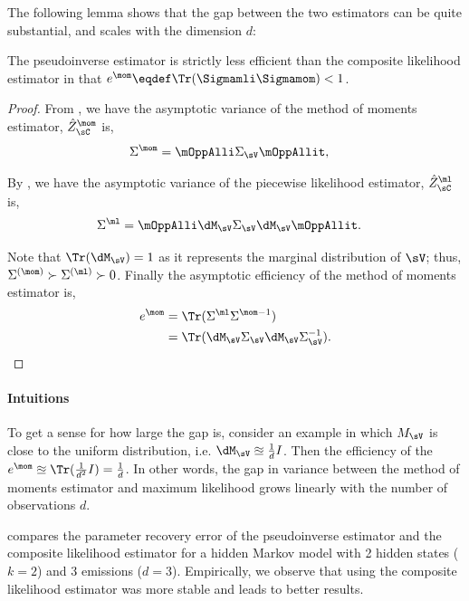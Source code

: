 
The following lemma shows that the gap between the two estimators can be quite substantial,
and scales with the dimension $d$: %
\begin{corollary}
The pseudoinverse estimator is strictly less efficient
than the composite likelihood estimator in that $e^\mom \eqdef \Tr(\Sigmamli \Sigmamom) < 1$.
\end{corollary}
\begin{proof}
  From , we have the asymptotic variance of the method of moments estimator, $\hat Z_\sC^{\mom}$ is,
  \begin{align*}
    \Sigma^{\mom} &= \mOppAlli \Sigma_\sV \mOppAllit,
  \end{align*}

  By , we have the asymptotic variance of the piecewise likelihood estimator, $\hat Z_\sC^{\ml}$ is,
  \begin{align*}
    \Sigma^{\ml} &= \mOppAlli \dM_\sV \Sigma_\sV \dM_\sV \mOppAllit.
  \end{align*}

  Note that $\Tr(\dM_\sV) = 1$ as it represents the marginal
  distribution of $\sV$; thus, $\Sigma^{(\mom)} \succ \Sigma^{(\ml)}
  \succ 0$.  Finally the asymptotic efficiency of the method of moments
  estimator is, 
  \begin{align*}
    e^\mom &= \Tr( \Sigma^{\ml}\Sigma^{\mom -1} )  \\
           &= \Tr( \dM_\sV \Sigma_\sV \dM_\sV \Sigma_\sV^{-1} ) .
  \end{align*}
\end{proof}

\paragraph{Intuitions}
To get a sense for how large the gap is, consider an example in which
$M_\sV$ is close to the uniform distribution, i.e. $\dM_\sV
  \approxeq \frac{1}{d} I$. 
Then the efficiency of the $e^\mom \approxeq \Tr(\frac{1}{d^2} I) = \frac{1}{d}$.
In other words, the gap in variance between the method of moments
  estimator and maximum likelihood grows linearly with the number of observations $d$.

 compares the parameter recovery error of the
  pseudoinverse estimator and the composite likelihood estimator for
  a hidden Markov model with 2 hidden states ($k=2$) and 3 emissions
  ($d=3$).
Empirically, we observe that using the composite likelihood estimator
  was more stable and leads to better results.

